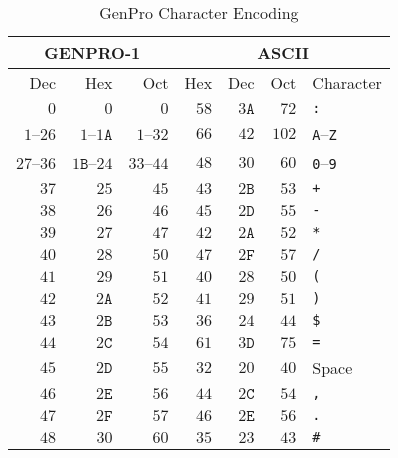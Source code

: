 \documentclass{report}
\begin{document}
\begin{table}[H]
\centering
\caption{GenPro Character Encoding}
\label{Tbl.CharEncoding}
\begin{tabular}{|rrr|rrrl|}
\multicolumn{3}{c}{GENPRO-1} & \multicolumn{4}{c}{ASCII} \\
\hline
Dec & Hex & Oct & Hex & Dec & Oct & Character \\
\hline
\(  0\) & \(  0\) & \(  0\) & \( 58\) & \( 3\mathtt{A}\) & \( 72\) & \texttt{:} \\
\hline
\(1\)--\(26\) & %
\(1\)--\(1\mathtt{A}\) & %
\(1\)--\(32\) & %
\( 66\) & %
\( 42\) & %
\(102\) & %
\texttt{A}--\texttt{Z} \\ %
\hline
\(27\)--\(36\) & %
\(1\mathtt{B}\)--\(24\) & %
\(33\)--\(44\) & %
\( 48\) & %
\( 30\) & %
\( 60\) & %
\texttt{0}--\texttt{9} \\ %
\hline
\( 37\) & \( 25\) & \( 45\) & \( 43\) & \( 2\mathtt{B}\) & \( 53\) & \texttt{+} \\ \hline
\( 38\) & \( 26\) & \( 46\) & \( 45\) & \( 2\mathtt{D}\) & \( 55\) & \texttt{-} \\ \hline
\( 39\) & \( 27\) & \( 47\) & \( 42\) & \( 2\mathtt{A}\) & \( 52\) & \texttt{*} \\ \hline
\( 40\) & \( 28\) & \( 50\) & \( 47\) & \( 2\mathtt{F}\) & \( 57\) & \texttt{/} \\ \hline
\( 41\) & \( 29\) & \( 51\) & \( 40\) & \( 28\) & \( 50\) & \texttt{(} \\ \hline
\( 42\) & \( 2\mathtt{A}\) & \( 52\) & \( 41\) & \( 29\) & \( 51\) & \texttt{)} \\ \hline
\( 43\) & \( 2\mathtt{B}\) & \( 53\) & \( 36\) & \( 24\) & \( 44\) & \texttt{\$} \\ \hline
\( 44\) & \( 2\mathtt{C}\) & \( 54\) & \( 61\) & \( 3\mathtt{D}\) & \( 75\) & \texttt{=} \\ \hline
\( 45\) & \( 2\mathtt{D}\) & \( 55\) & \( 32\) & \( 20\) & \( 40\) & Space \\ \hline
\( 46\) & \( 2\mathtt{E}\) & \( 56\) & \( 44\) & \( 2\mathtt{C}\) & \( 54\) & \texttt{,} \\ \hline
\( 47\) & \( 2\mathtt{F}\) & \( 57\) & \( 46\) & \( 2\mathtt{E}\) & \( 56\) & \texttt{.} \\ \hline
\( 48\) & \( 30\) & \( 60\) & \( 35\) & \( 23\) & \( 43\) & \texttt{\#} \\ \hline

\end{tabular}
\end{table}
\end{document}
